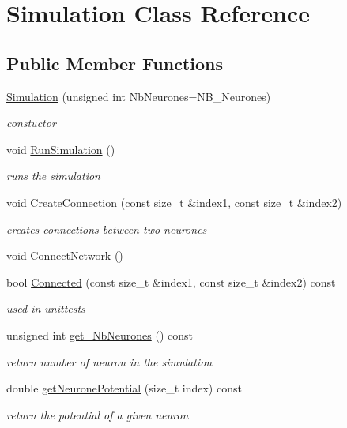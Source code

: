 \hypertarget{classSimulation}{\section{Simulation Class Reference}
\label{classSimulation}
}
\subsection*{Public Member Functions}
\begin{DoxyCompactItemize}
\item 
\hyperlink{classSimulation_af57d7b7d29a10e0d182e66ecca1d3208}{Simulation} (unsigned int Nb\-Neurones=N\-B\-\_\-\-Neurones)
\begin{DoxyCompactList}\small\item\em constuctor \end{DoxyCompactList}\item 
void \hyperlink{classSimulation_aa7736d6f953c5e35696b8ac2397a4bea}{Run\-Simulation} ()
\begin{DoxyCompactList}\small\item\em runs the simulation \end{DoxyCompactList}\item 
void \hyperlink{classSimulation_a59aacc98d8ef86ab6b5b7b1c4f1c92fd}{Create\-Connection} (const size\-\_\-t \&index1, const size\-\_\-t \&index2)
\begin{DoxyCompactList}\small\item\em creates connections between two neurones \end{DoxyCompactList}\item 
void \hyperlink{classSimulation_ae6a122f08ee8237f50cc426eace533f6}{Connect\-Network} ()
\item 
bool \hyperlink{classSimulation_a6fa966b55e89ca6aa6c74f1e9317ee15}{Connected} (const size\-\_\-t \&index1, const size\-\_\-t \&index2) const 
\begin{DoxyCompactList}\small\item\em used in unittests \end{DoxyCompactList}\item 
unsigned int \hyperlink{classSimulation_a3fe763c284ff62e74bdf52656251d93a}{get\-\_\-\-Nb\-Neurones} () const 
\begin{DoxyCompactList}\small\item\em return number of neuron in the simulation \end{DoxyCompactList}\item 
double \hyperlink{classSimulation_a9bbb7128a50ceb957d6e04f9719b88d1}{get\-Neurone\-Potential} (size\-\_\-t index) const 
\begin{DoxyCompactList}\small\item\em return the potential of a given neuron \end{DoxyCompactList}\end{DoxyCompactItemize}


